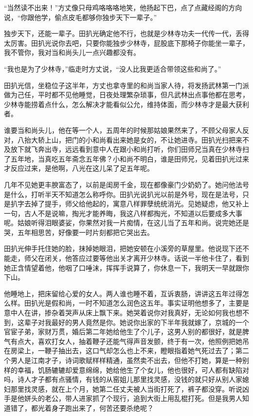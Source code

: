 “当然读不出来！”方丈像只母鸡咯咯咯地笑，他扬起下巴，点了点藏经阁的方向说，“你跟他学，偷点皮毛都够你独步天下一辈子。”

独步天下，还能一辈子。田扒光确定他不行，也就是少林寺功夫一代传一代，丢得太厉害。田扒光说你去吧，只要你能独步少林寺，屁股底下那椅子你能坐一辈子，我不管你，我对当和尚头儿一点兴趣都没有。

“我也是为了少林寺，”临走时方丈说，“没人比我更适合带领这些和尚了。”

田扒光信，坐稳位子这半年，方丈也拿寺里的和尚当家人待，将发扬武林第一门派做为己任，平时都不见他睡觉，日夜处理繁杂琐事，但凡武林出点事他都在思考，少林寺能捞着点什么，怎么解决才能看似公允，维持体面，而少林寺才是最大获利者。

谁要当和尚头儿，他在等一个人，五周年的时候那姑娘果然来了，不顾父母家人反对，八抬大轿上山，把门的小和尚看出来她是女的，不让她进寺。田扒光扫把来不及放下就飞奔出寺，远远看到意中人在跟小和尚打听，你们田师兄当真在少林寺扫了五年地，当真吃五年斋念五年佛？小和尚不明白，谁是田师兄，见着田扒光过来才反应过来，是他啊，八光在这儿呆了足五年呢。

几年不见她更丰腴富态了，以前是闺房千金，现在都像豪门少奶奶了。她问他法号是什么，打听半天不知道怎么称呼你。田扒光说扒光以前是外号，现在是法号，只是扒字去掉了提手，师父给他起的，寓意八样罪孽统统消光。见她疑虑，他又补上一句，古人不是说嘛，掏光才能养晦，我这八样都掏光，不知道以后要成多大事呢。姑娘听得泪眼婆娑，你果然对我一片痴情，在这儿当了五年和尚。说完她还是哭，五年相思苦，好像要一时片刻都把它哭出去。

田扒光伸手托住她的脸，抹掉她眼泪，把她安顿在小溪旁的草屋里。他说现下还不能走，师父在闭关，他答应过要等他出关才离开少林寺。话说一半他卡住了，看到她正含情望着他，他咽了口唾沫，挥挥手说算了，你休息一下，我明天一早就跟你下山。

他睡地上，把床留给心爱的女人。两人谁也睡不着，互诉衷肠，讲讲这五年过得怎么样。田扒光是假和尚，一时不知道怎么润色这五年。事实证明他想多了，主要是意中人在讲，掺杂着哭声从床上飘下来。她哭着说你对我真好，无论如何我也想不到，这辈子对我最好的男人竟然是你。她说你出家的下半年我就嫁了，京城的一个官宦子弟，家财万贯，婚后第二年她给他生了个儿子，这男人别的都很好，就是脾气有点大，喜欢打女人，抽着鞭子还能气得声音发颤，终于有一次，他照例把她吊在房梁上，一鞭子抽出去，这口气却怎么也上不来，瞪眼指着她气死过去了；第二个男人是江南才子，诗词歌赋样样精通，虽然卖不出去，但他不打她，算是一种别样的幸福，饥肠辘辘却爱意绵绵，她给他生了个女儿，他也很好，可人都有缺陷对吗，诗人才子都有点骚情，有钱的从窑姐儿那里找灵感，没钱的就只好从别人家媳妇那里找灵感，就在上个月，她第二任丈夫被人当街打死了，裤子都没穿。听说凶手是他姘头的老公，带人进家抓了个现行，追到大街上用乱棍打死。但是我男人知道错了，都光着身子跑出来了，何苦还要杀绝呢？

